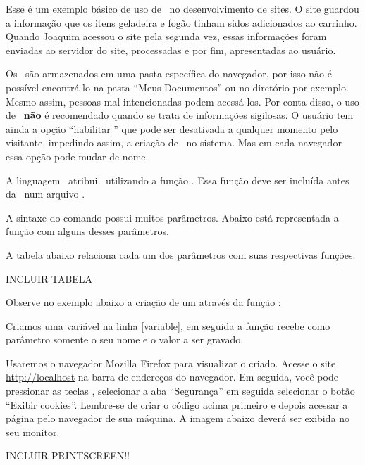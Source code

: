 Esse é um exemplo básico de uso de \cookies~no desenvolvimento de sites. O site guardou a informação 
que os itens geladeira e fogão tinham sidos adicionados ao carrinho. Quando Joaquim acessou o site 
pela segunda vez, essas informações foram enviadas ao servidor do site, processadas e por fim, 
apresentadas ao usuário.

Os \cookies~são armazenados em uma pasta específica do navegador, por isso não é possível encontrá-lo 
na pasta ``Meus Documentos'' ou no diretório  por exemplo. Mesmo assim, 
pessoas mal intencionadas podem acessá-los. Por conta disso, o uso de \cookies~\textbf{não} é 
recomendado quando se trata de informações sigilosas. O usuário tem ainda a opção ``habilitar \cookies'' 
que pode ser desativada a qualquer momento pelo visitante, impedindo assim, a criação de \cookies~no 
sistema. Mas em cada navegador essa opção pode mudar de nome. 

A linguagem \php~atribui \cookies~utilizando a função \funcaosetcookie. Essa função deve ser incluída antes 
da \tag~\taghtml num arquivo \phpextensao.

A sintaxe do comando \funcaosetcookie possui muitos parâmetros. Abaixo está representada a função
com alguns desses parâmetros. 



A tabela abaixo relaciona cada um dos parâmetros com suas respectivas funções.

INCLUIR TABELA

Observe no exemplo abaixo a criação de um \cookie através da função \funcaosetcookie:



Criamos uma variável na linha \ref{variable}, em seguida a função \funcaosetcookie recebe como 
parâmetro somente o seu nome e o valor a ser gravado.

Usaremos o navegador Mozilla Firefox para visualizar o \cookie criado. Acesse o site 
\url{http://localhost} na barra de endereços do navegador. Em seguida, você pode pressionar as 
teclas , selecionar a aba ``Segurança'' em seguida selecionar o botão 
``Exibir cookies''. Lembre-se de criar o código acima primeiro e depois acessar a página pelo 
navegador de sua máquina. A imagem abaixo deverá ser exibida no seu monitor.

INCLUIR PRINTSCREEN!!

